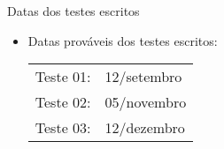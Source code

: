 \documentclass[
size=17pt,
paper=smartboard,
mode=present,
display=slidesnotes,
style=sailor,
nopagebreaks,
blackslide,
fleqn]{powerdot}
\begin{document}
      \begin{slide}[toc=]{Datas dos testes escritos}
         \begin{itemize}
            \item Datas prováveis dos testes escritos:
            \begin{table}
               \centering
               \begin{tabular}{|l l|}
                  \hline
                  Teste 01: & 12/setembro\\
                  Teste 02: & 05/novembro\\
                  Teste 03: & 12/dezembro\\
                  \hline
               \end{tabular}
            \end{table}
         \end{itemize}
      \end{slide}
\end{document}

